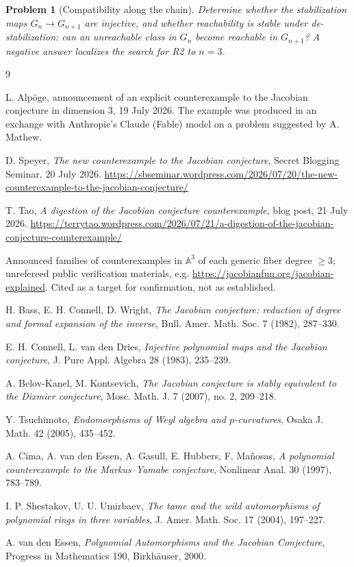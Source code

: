 \documentclass[11pt]{article}
\theoremstyle{change}
\newtheorem{problem}[equation]{Problem}
\theoremstyle{nonumberplain}
\numberwithin{equation}{section}
\begin{document}
\begin{problem}[Compatibility along the chain]
Determine whether the stabilization maps $G_n \to G_{n+1}$ are injective, and whether reachability is stable under de-stabilization: can an unreachable class in $G_n$ become reachable in $G_{n+1}$? A negative answer localizes the search for R2 to $n = 3$.
\end{problem}

\begin{thebibliography}{9}

 L. Alp\"oge, announcement of an explicit counterexample to the Jacobian conjecture in dimension $3$, 19 July 2026. The example was produced in an exchange with Anthropic's Claude (Fable) model on a problem suggested by A. Mathew.

 D. Speyer, \emph{The new counterexample to the Jacobian conjecture}, Secret Blogging Seminar, 20 July 2026. \url{https://sbseminar.wordpress.com/2026/07/20/the-new-counterexample-to-the-jacobian-conjecture/}

 T. Tao, \emph{A digestion of the Jacobian conjecture counterexample}, blog post, 21 July 2026. \url{https://terrytao.wordpress.com/2026/07/21/a-digestion-of-the-jacobian-conjecture-counterexample/}

 Announced families of counterexamples in $\mathbb{A}^3$ of each generic fiber degree $\geq 3$; unrefereed public verification materials, e.g. \url{https://jacobianfun.org/jacobian-explained}. Cited as a target for confirmation, not as established.

 H. Bass, E. H. Connell, D. Wright, \emph{The Jacobian conjecture: reduction of degree and formal expansion of the inverse}, Bull. Amer. Math. Soc. 7 (1982), 287--330.

 E. H. Connell, L. van den Dries, \emph{Injective polynomial maps and the Jacobian conjecture}, J. Pure Appl. Algebra 28 (1983), 235--239.

 A. Belov-Kanel, M. Kontsevich, \emph{The Jacobian conjecture is stably equivalent to the Dixmier conjecture}, Mosc. Math. J. 7 (2007), no. 2, 209--218.

 Y. Tsuchimoto, \emph{Endomorphisms of Weyl algebra and $p$-curvatures}, Osaka J. Math. 42 (2005), 435--452.

 A. Cima, A. van den Essen, A. Gasull, E. Hubbers, F. Ma\~nosas, \emph{A polynomial counterexample to the Markus--Yamabe conjecture}, Nonlinear Anal. 30 (1997), 783--789.

 I. P. Shestakov, U. U. Umirbaev, \emph{The tame and the wild automorphisms of polynomial rings in three variables}, J. Amer. Math. Soc. 17 (2004), 197--227.

 A. van den Essen, \emph{Polynomial Automorphisms and the Jacobian Conjecture}, Progress in Mathematics 190, Birkh\"auser, 2000.

\end{thebibliography}
\end{document}
